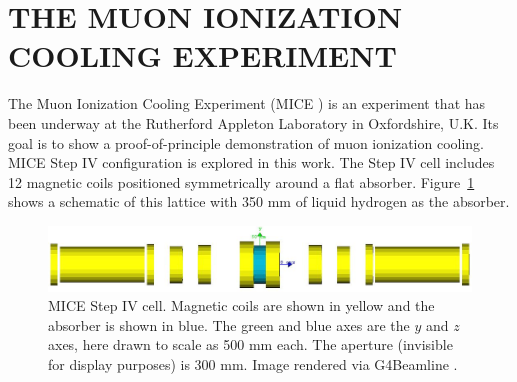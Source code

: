 \documentclass[a4paper,11pt]{article}
\begin{document}

\section{THE MUON IONIZATION COOLING EXPERIMENT}
The Muon Ionization Cooling Experiment (MICE \cite{mice}) is an experiment that has been underway at the Rutherford Appleton Laboratory in Oxfordshire, U.K. Its goal is to show a proof-of-principle demonstration of muon ionization cooling. MICE Step IV configuration is explored in this work. The Step IV cell includes 12 magnetic coils positioned symmetrically around a flat absorber. Figure~\ref{fig:miceStepIV} shows a schematic of this lattice with 350 mm of liquid hydrogen as the absorber.
\begin{figure}[H]
  \centering
    \includegraphics[width=\columnwidth]{Figures/miceStepIV} 
  \caption[MICE Step IV cell.]{MICE Step IV cell. Magnetic coils are shown in yellow and the absorber is shown in blue. The green and blue axes are the $y$ and $z$ axes, here drawn to scale as 500 mm each. The aperture (invisible for display purposes) is 300 mm. Image rendered via G4Beamline \cite{G4BL}.}
  \label{fig:miceStepIV}
\end{figure}
\end{document}

